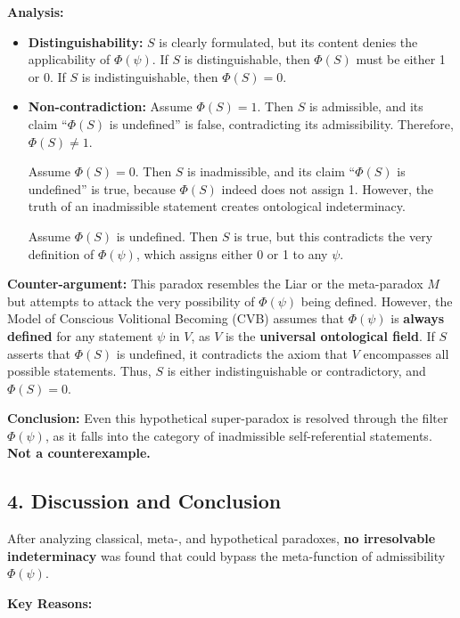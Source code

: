 \documentclass[12pt]{article}
\begin{document}
\textbf{Analysis:}

\begin{itemize}
\item \textbf{Distinguishability:}  
$S$ is clearly formulated, but its content denies the applicability of $\Phi(\psi)$.  
If $S$ is distinguishable, then $\Phi(S)$ must be either 1 or 0.  
If $S$ is indistinguishable, then $\Phi(S) = 0$.

\item \textbf{Non-contradiction:}  
Assume $\Phi(S) = 1$. Then $S$ is admissible, and its claim ``$\Phi(S)$ is undefined'' is false, contradicting its admissibility.  
Therefore, $\Phi(S) \neq 1$.

Assume $\Phi(S) = 0$. Then $S$ is inadmissible, and its claim ``$\Phi(S)$ is undefined'' is true, because $\Phi(S)$ indeed does not assign 1.  
However, the truth of an inadmissible statement creates ontological indeterminacy.

Assume $\Phi(S)$ is undefined. Then $S$ is true, but this contradicts the very definition of $\Phi(\psi)$, which assigns either 0 or 1 to any $\psi$.
\end{itemize}

\textbf{Counter-argument:}  
This paradox resembles the Liar or the meta-paradox $M$ but attempts to attack the very possibility of $\Phi(\psi)$ being defined.  
However, the Model of Conscious Volitional Becoming (CVB) assumes that $\Phi(\psi)$ is \textbf{always defined} for any statement $\psi$ in $V$, as $V$ is the \textbf{universal ontological field}.  
If $S$ asserts that $\Phi(S)$ is undefined, it contradicts the axiom that $V$ encompasses all possible statements.  
Thus, $S$ is either indistinguishable or contradictory, and \textbf{$\Phi(S) = 0$}.

\textbf{Conclusion:}  
Even this hypothetical super-paradox is resolved through the filter $\Phi(\psi)$, as it falls into the category of inadmissible self-referential statements. \textbf{Not a counterexample.}

\subsection*{4. Discussion and Conclusion}

After analyzing classical, meta-, and hypothetical paradoxes, \textbf{no irresolvable indeterminacy} was found that could bypass the meta-function of admissibility $\Phi(\psi)$.

\textbf{Key Reasons:}
\end{document}
